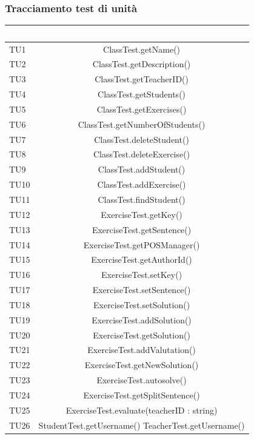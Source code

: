\subsubsection{Tracciamento test di unità}
\begin{longtable}{|>{\centering\arraybackslash}m{1.6cm}|c|}		
 	\rowcolor{LightBlue}
		\textbf{\textcolor{white}{Test}}
		& \textbf{\textcolor{white}{Metodo}}\\		\hline
		TU1 & ClassTest.getName()\\ \hline
		TU2 & ClassTest.getDescription()\\ \hline
		TU3 & ClassTest.getTeacherID()\\ \hline
		TU4 & ClassTest.getStudents()\\ \hline
		TU5 & ClassTest.getExercises()\\ \hline
		TU6 & ClassTest.getNumberOfStudents()\\ \hline
		TU7 & ClassTest.deleteStudent()\\ \hline
		TU8 & ClassTest.deleteExercise()\\ \hline
		TU9 & ClassTest.addStudent()\\ \hline
		TU10 & ClassTest.addExercise()\\ \hline
		TU11 & ClassTest.findStudent()\\ \hline
		TU12 & ExerciseTest.getKey()\\ \hline
		TU13 & ExerciseTest.getSentence()\\ \hline
		TU14 & ExerciseTest.getPOSManager()\\ \hline
		TU15 & ExerciseTest.getAuthorId()\\ \hline
		TU16 & ExerciseTest.setKey()\\ \hline
		TU17 & ExerciseTest.setSentence()\\ \hline
		TU18 & ExerciseTest.setSolution()\\ \hline
		TU19 & ExerciseTest.addSolution()\\ \hline
		TU20 & ExerciseTest.getSolution()\\ \hline
		TU21 & ExerciseTest.addValutation()\\ \hline
		TU22 & ExerciseTest.getNewSolution()\\ \hline
		TU23 & ExerciseTest.autosolve()\\ \hline
		TU24 & ExerciseTest.getSplitSentence()\\ \hline
		TU25 & ExerciseTest.evaluate(teacherID : string)\\ \hline
		TU26 & StudentTest.getUsername() TeacherTest.getUsername()\\ \hline

\end{longtable}
